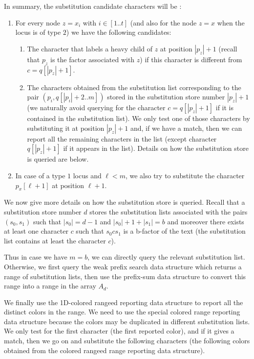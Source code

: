 \documentclass{article}
\newcommand{\?}{\mskip1.5mu}
\begin{document}
In summary, the substitution candidate characters will be :
\begin{enumerate}
\item For every node $z=x_i$ with $i\in[1..t]$ (and also for the node $z=x$ when the locus is of type $2$) we have the following candidates:
\begin{enumerate}
\item The character that labels a heavy child of $z$ at position $|p_z|+1$ (recall that $p_z$ is the factor associated with $z$) if this character is different from $c=q[|p_z|+1]$. 
\item The characters obtained from the substitution list corresponding to the pair $(p_i,q[|p_i|+2..m])$ stored in the substitution store number $|p_z|+1$ (we naturally avoid querying for the character $c=q[|p_z|+1]$ if it is contained in the substitution list). We only test one of those characters by substituting it at position $|p_z|+1$ and, if we have a match, then we can report all the remaining characters in the list (except character $q[|p_z|+1]$ if it appears in the list). Details on how the substitution store is queried are below. 
\end{enumerate}
\item In case of a type $1$ locus and $\ell<m$, we also try to substitute the character $p_x[\ell+1]$ at position $\ell+1$. 
\end{enumerate}

We now give more details on how the substitution store is queried. Recall that a substitution store number $d$ stores the substitution lists associated with the pairs $(s_0,s_1)$ such that $|s_0|=d-1$ and $|s_0|+1+|s_1|=b$ and moreover there exists at least one character $c$ such that $s_0cs_1$ is a b-factor of the text (the substitution list contains at least the character $c$). 

Thus in case we have $m=b$, we can directly query the relevant substitution list. 
Otherwise, we first query the weak prefix search data structure which returns a range of substitution lists, then use the prefix-sum data structure to convert this range into a range in the array $A_d$.

We finally use the 1D-colored rangeed reporting data structure to report all the distinct colors in the range. We need to use the special colored range reporting data structure because the colors may be duplicated in different substitution lists. We only test for the first character (the first reported color), and if it gives a match, then we go on and substitute the following characters (the following colors obtained from the colored rangeed range reporting data structure). 
\end{document}
